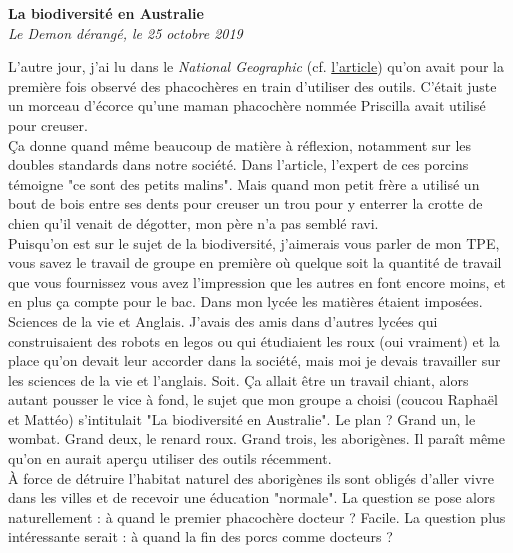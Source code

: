 \documentclass[french,12pt,amstex,a4paper]{article}
\begin{document}
\begin{center}
{\bf La biodiversité en Australie}\\
{\it Le Demon dérangé, le 25 octobre 2019}\\
\end{center}

L'autre jour, j'ai lu dans le {\it National Geographic} (cf. \href{https://www.nationalgeographic.fr/animaux/2019/10/des-porcins-observes-en-train-dutiliser-des-outils-pour-la-premiere-fois?fbclid=IwAR2x2m3CVhDZbEIHZMPu5Des0gXgkxhVwv0-csoDljXY6nzQ7QAd-n-L-nw}{l'article}) qu'on avait pour la première fois observé des phacochères en train d'utiliser des outils. C'était juste un morceau d'écorce qu'une maman phacochère nommée Priscilla avait utilisé pour creuser.\\

Ça donne quand même beaucoup de matière à réflexion, notamment sur les doubles standards dans notre société. Dans l'article, l'expert de ces porcins témoigne "ce sont des petits malins". Mais quand mon petit frère a utilisé un bout de bois entre ses dents pour creuser un trou pour y enterrer la crotte de chien qu'il venait de dégotter, mon père n'a pas semblé ravi.\\

Puisqu'on est sur le sujet de la biodiversité, j'aimerais vous parler de mon TPE, vous savez le travail de groupe en première où quelque soit la quantité de travail que vous fournissez vous avez l'impression que les autres en font encore moins, et en plus ça compte pour le bac. Dans mon lycée les matières étaient imposées. Sciences de la vie et Anglais. J'avais des amis dans d'autres lycées qui construisaient des robots en legos ou qui étudiaient les roux (oui vraiment) et la place qu'on devait leur accorder dans la société, mais moi je devais travailler sur les sciences de la vie et l'anglais. Soit. Ça allait être un travail chiant, alors autant pousser le vice à fond, le sujet que mon groupe a choisi (coucou Raphaël et Mattéo) s'intitulait "La biodiversité en Australie". Le plan ? Grand un, le wombat. Grand deux, le renard roux. Grand trois, les aborigènes. Il paraît même qu'on en aurait aperçu utiliser des outils récemment.\\

À force de détruire l'habitat naturel des aborigènes ils sont obligés d'aller vivre dans les villes et de recevoir une éducation "normale". La question se pose alors naturellement : à quand le premier phacochère docteur ? Facile. La question plus intéressante serait : à quand la fin des porcs comme docteurs ?
\end{document}
